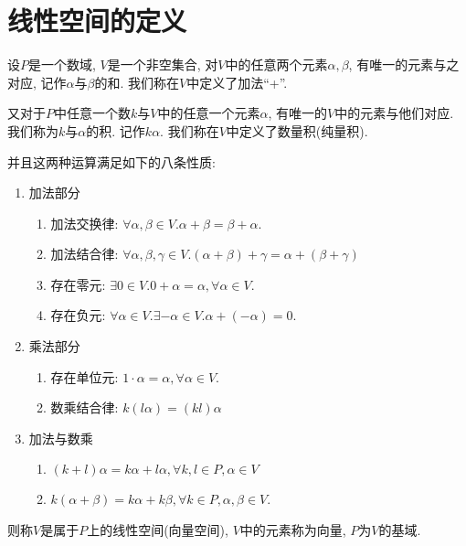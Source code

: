 \documentclass{ctexart}
\begin{document}
\section{线性空间的定义}

\begin{definition}[线性空间]
    设$P$是一个数域, $V$是一个非空集合, 对$V$中的任意两个元素$\alpha,\beta$, 有唯一的元素与之对应, 记作$\alpha$与$\beta$的和. 我们称在$V$中定义了加法``+''. 

    又对于$P$中任意一个数$k$与$V$中的任意一个元素$\alpha$, 有唯一的$V$中的元素与他们对应. 我们称为$k$与$\alpha$的积. 记作$k\alpha$. 我们称在$V$中定义了数量积(纯量积). 

    并且这两种运算满足如下的八条性质: 

    \begin{enumerate}
        \item 加法部分
        \begin{enumerate}
            \item 加法交换律: $\forall \alpha, \beta \in V. \alpha+\beta=\beta+\alpha$.
            \item 加法结合律: $\forall \alpha,\beta,\gamma \in V. (\alpha+\beta)+\gamma=\alpha+(\beta+\gamma)$
            \item 存在零元: $\exists 0\in V. 0+\alpha=\alpha, \forall \alpha\in V$. 
            \item 存在负元: $\forall \alpha\in V. \exists -\alpha\in V. \alpha+(-\alpha)=0$.
        \end{enumerate}
    \item 乘法部分
        \begin{enumerate}
            \item 存在单位元: $1\cdot \alpha=\alpha, \forall \alpha\in V$. 
            \item 数乘结合律: $k(l\alpha)=(kl)\alpha$
        \end{enumerate}
    \item 加法与数乘
        \begin{enumerate}
            \item $(k+l)\alpha=k\alpha+l\alpha, \forall k,l \in P, \alpha\in V$
            \item $k(\alpha+\beta)=k\alpha+k\beta, \forall k\in P, \alpha,\beta\in V$.
        \end{enumerate}
    \end{enumerate}
    则称$V$是属于$P$上的线性空间(向量空间), $V$中的元素称为向量, $P$为$V$的基域.  
\end{definition}
\end{document}
